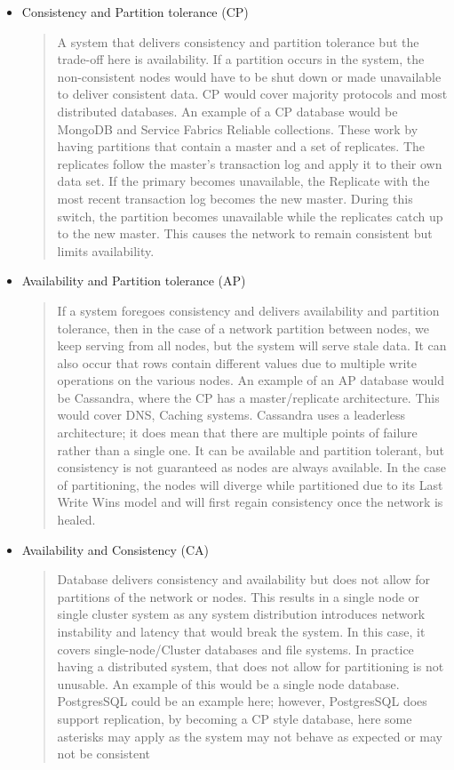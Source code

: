\documentclass[a4paper,10pt,titlepage]{report}
\begin{document}
\begin{itemize}
    \item Consistency and Partition tolerance (CP) \\ 
    \begin{quote}
         A system that delivers consistency and partition tolerance but the trade-off here is availability. If a partition occurs in the system, the non-consistent nodes would have to be shut down or made unavailable to deliver consistent data. CP would cover majority protocols and most distributed databases. An example of a CP database would be MongoDB and Service Fabrics Reliable collections. These work by having partitions that contain a master and a set of replicates. The replicates follow the master's transaction log and apply it to their own data set. If the primary becomes unavailable, the Replicate with the most recent transaction log becomes the new master. During this switch, the partition becomes unavailable while the replicates catch up to the new master. This causes the network to remain consistent but limits availability.
    \end{quote}


    \item Availability and Partition tolerance (AP) \\ 
    \begin{quote}
    If a system foregoes consistency and delivers availability and partition tolerance, then in the case of a network partition between nodes, we keep serving from all nodes, but the system will serve stale data. It can also occur that rows contain different values due to multiple write operations on the various nodes. An example of an AP database would be Cassandra, where the CP has a master/replicate architecture. This would cover DNS, Caching systems. Cassandra uses a leaderless architecture; it does mean that there are multiple points of failure rather than a single one. It can be available and partition tolerant, but consistency is not guaranteed as nodes are always available. In the case of partitioning, the nodes will diverge while partitioned due to its Last Write Wins model and will first regain consistency once the network is healed. 
    \end{quote}

    \item Availability and Consistency (CA) \\ 
    \begin{quote}Database delivers consistency and availability but does not allow for partitions of the network or nodes. This results in a single node or single cluster system as any system distribution introduces network instability and latency that would break the system. In this case, it covers single-node/Cluster databases and file systems. In practice having a distributed system, that does not allow for partitioning is not unusable. An example of this would be a single node database. PostgresSQL could be an example here; however, PostgresSQL does support replication, by becoming a CP style database, here some asterisks may apply as the system may not behave as expected or may not be consistent\cite{aphyrpostgres}  \end{quote}
\end{itemize}
\end{document}
